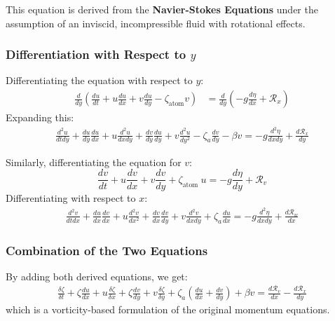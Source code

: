 \documentclass[12pt]{article}
\begin{document}
    This equation is derived from the \textbf{Navier-Stokes Equations} under the assumption of an inviscid, incompressible fluid with rotational effects.

    \subsubsection*{Differentiation with Respect to $y$}
    Differentiating the equation with respect to $y$:
    \begin{align}
        \frac{d}{dy} \left( \frac{d u}{d t} + u \frac{d u}{d x} + v \frac{d u}{d y} - \zeta_\text{atom} v \right) &= \frac{d}{dy} \left( - g \frac{d \eta}{d x} + \mathcal{R}_x \right)
    \end{align}
    Expanding this:
    \begin{align}
        \frac{d^2 u}{d t d y}+\frac{d u}{d y} \frac{d u}{d x}+u \frac{d^2 u}{d x d y}+\frac{d v}{d y} \frac{d u}{d y}+v \frac{d^2 u}{d y^2}-\zeta_a \frac{d v}{d y}-\beta v=-g \frac{d^2 \eta}{d x d y}+\frac{d \mathcal{R}_x}{d y}
    \end{align}

    Similarly, differentiating the equation for $v$:
    \begin{equation*}
        \frac{d v}{d t}+u \frac{d v}{d x}+v \frac{d v}{d y}+\zeta_{\text {atom }} u=-g \frac{d \eta}{d y}+\mathcal{R}_v
    \end{equation*}
    Differentiating with respect to $x$:
    \begin{align}
        \frac{d^2 v}{d t d x}+\frac{d u}{d x} \frac{d v}{d x}+u \frac{d^2 v}{d x^2}+\frac{d v}{d x} \frac{d v}{d y}+v \frac{d^2 v}{d x d y}+\zeta_a \frac{d u}{d x}=-g \frac{d^2 \eta}{d x d y}+\frac{d \mathcal{R}_w}{d x}
    \end{align}

    \subsubsection*{Combination of the Two Equations}
    By adding both derived equations, we get:
    \begin{align}
        \frac{\delta \zeta}{\delta t}+\zeta \frac{d u}{d x}+u \frac{\delta \zeta}{\delta x}+\zeta \frac{d v}{d y}+v \frac{\delta \zeta}{\delta y}+\zeta_a\left(\frac{d u}{d x}+\frac{d v}{d y}\right)+\beta v=\frac{d \mathcal{R}_v}{d x}-\frac{d \mathcal{R}_x}{d y}
    \end{align}
    which is a vorticity-based formulation of the original momentum equations.
\end{document}
